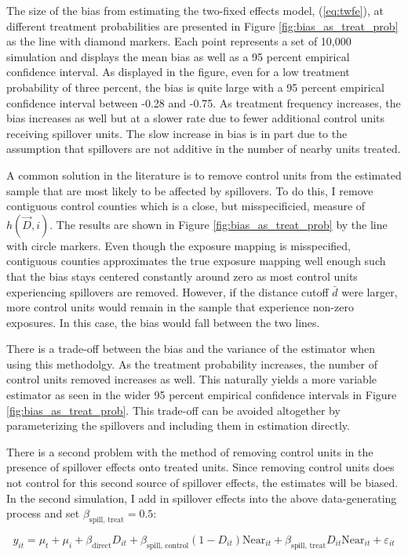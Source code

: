 \documentclass[11pt]{article}
\begin{document}
The size of the bias from estimating the two-fixed effects model, (\ref{eq:twfe}), at different treatment probabilities are presented in Figure \ref{fig:bias_as_treat_prob} as the line with diamond markers. Each point represents a set of 10,000 simulation and displays the mean bias as well as a 95 percent empirical confidence interval. As displayed in the figure, even for a low treatment probability of three percent, the bias is quite large with a 95 percent empirical confidence interval between -0.28 and -0.75. As treatment frequency increases, the bias increases as well but at a slower rate due to fewer additional control units receiving spillover units. The slow increase in bias is in part due to the assumption that spillovers are not additive in the number of nearby units treated.

A common solution in the literature is to remove control units from the estimated sample that are most likely to be affected by spillovers. To do this, I remove contiguous control counties which is a close, but misspecificied, measure of $h(\vec{D}, i)$. The results are shown in Figure \ref{fig:bias_as_treat_prob} by the line with circle markers. Even though the exposure mapping is misspecified, contiguous counties approximates the true exposure mapping well enough such that the bias stays centered constantly around zero as most control units experiencing spillovers are removed. However, if the distance cutoff $\bar{d}$ were larger, more control units would remain in the sample that experience non-zero exposures. In this case, the bias would fall between the two lines.

There is a trade-off between the bias and the variance of the estimator when using this methodolgy. As the treatment probability increases, the number of control units removed increases as well. This naturally yields a more variable estimator as seen in the wider 95 percent empirical confidence intervals in Figure \ref{fig:bias_as_treat_prob}. This trade-off can be avoided altogether by parameterizing the spillovers and including them in estimation directly.

There is a second problem with the method of removing control units in the presence of spillover effects onto treated units. Since removing control units does not control for this second source of spillover effects, the estimates will be biased. In the second simulation, I add in spillover effects into the above data-generating process and set $\beta_{\text{spill, treat}} = 0.5$:

\begin{equation}
    \label{eq:dgp2} 
    y_{it} = \mu_t + \mu_i + \beta_{\text{direct}} D_{it} + \beta_{\text{spill, control}} (1-D_{it}) \text{Near}_{it} + \beta_{\text{spill, treat}} D_{it} \text{Near}_{it} + \varepsilon_{it}   
\end{equation}
\end{document}
